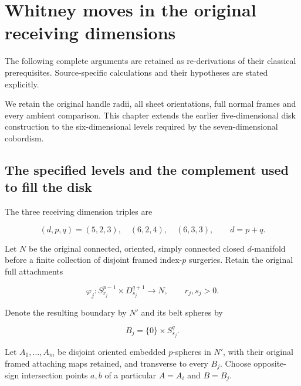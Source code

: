 \section{Whitney moves in the original receiving dimensions}\label{courseIII:whitney-moves-in-the-receiving-dimensions:section}

The following complete arguments are retained as re-derivations of their classical prerequisites. Source-specific calculations and their hypotheses are stated explicitly.

We retain the original handle radii, all sheet orientations, full normal frames and every ambient comparison. This chapter extends the earlier five-dimensional disk construction to the six-dimensional levels required by the seven-dimensional cobordism.

\subsection{The specified levels and the complement used to fill the disk}
\label{courseIII:whitney-moves-in-the-receiving-dimensions:receiving-whitney-levels}

\label{courseIII:whitney-moves-in-the-receiving-dimensions:section-1}\label{courseIII:whitney-receiving:1}

The three receiving dimension triples are

\begin{equation}
(d,p,q)=(5,2,3),\quad(6,2,4),\quad(6,3,3),
 \qquad d=p+q.
 \label{courseIII:whitney-moves-in-the-receiving-dimensions:eq:1.1}
\end{equation}

Let \(N\) be the original connected, oriented, simply connected closed \(d\)-manifold before a finite collection of disjoint framed index-\(p\) surgeries. Retain the original full attachments

\begin{equation}
\varphi_j:S^{p-1}_{r_j}\times D^{q+1}_{s_j}\longrightarrow N,
 \qquad r_j,s_j>0.
 \label{courseIII:whitney-moves-in-the-receiving-dimensions:eq:1.2}
\end{equation}

Denote the resulting boundary by \(N'\) and its belt spheres by

\begin{equation}
B_j=\{0\}\times S^q_{s_j}.
 \label{courseIII:whitney-moves-in-the-receiving-dimensions:eq:1.3}
\end{equation}

Let \(A_1,\ldots,A_m\) be disjoint oriented embedded \(p\)-spheres in \(N'\), with their original framed attaching maps retained, and transverse to every \(B_j\). Choose opposite-sign intersection points \(a,b\) of a particular \(A=A_i\) and \(B=B_j\).

